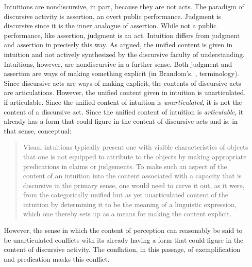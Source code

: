 \documentclass[12pt]{article}
\begin{document}
Intuitions are nondiscursive, in part, because they are not acts. The paradigm of discursive activity is assertion, an overt public performance. Judgment is discursive since it is the inner analogue of assertion. While not a public performance, like assertion, judgment is an act. Intuition differs from judgment and assertion in precisely this way. As \citet[chapter 9]{Prichard:1909yg} argued, the unified content is given in intuition and not actively synthesized by the discursive faculty of understanding. Intuitions, however, are nondiscursive in a further sense. Both judgment and assertion are ways of making something explicit (in Brandom's, \citeyear{Brandom:1994fk}, terminology). Since discursive acts are ways of making explicit, the contents of discursive acts are articulations. However, the unified content given in intuition is unarticulated, if articulable. Since the unified content of intuition is \emph{unarticulated}, it is not the content of a discursive act. Since the unified content of intuition is \emph{articulable}, it already has a form that could figure in the content of discursive acts and is, in that sense, conceptual:
\begin{quote}
	Visual intuitions typically present one with visible characteristics of objects that one is not equipped to attribute to the objects by making appropriate predications in claims or judgements. To make such an aspect of the content of an intuition into the content associated with a capacity that is discursive in the primary sense, one would need to carve it out, as it were, from the categorically unified but as yet unarticulated content of the intuition by determining it to be the meaning of a linguistic expression, which one thereby sets up as a means for making the content explicit.
\end{quote}
However, the sense in which the content of perception can reasonably be said to be unarticulated conflicts with its already having a form that could figure in the content of discursive activity. The conflation, in this passage, of exemplification and predication masks this conflict.
\end{document}
